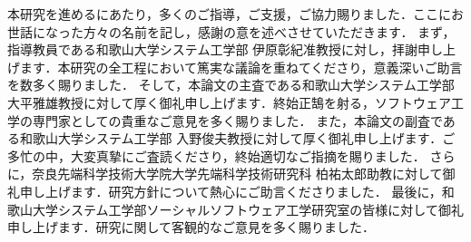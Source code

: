\documentclass[11pt]{jreport}
\begin{document}


\begin{acknowledgements}
本研究を進めるにあたり，多くのご指導，ご支援，ご協力賜りました．ここにお世話になった方々の名前を記し，感謝の意を述べさせていただきます．
まず，指導教員である和歌山大学システム工学部 伊原彰紀准教授に対し，拝謝申し上げます．本研究の全工程において篤実な議論を重ねてくださり，意義深いご助言を数多く賜りました．
そして，本論文の主査である和歌山大学システム工学部 大平雅雄教授に対して厚く御礼申し上げます．終始正鵠を射る，ソフトウェア工学の専門家としての貴重なご意見を多く賜りました．
また，本論文の副査である和歌山大学システム工学部 入野俊夫教授に対して厚く御礼申し上げます．ご多忙の中，大変真摯にご査読くださり，終始適切なご指摘を賜りました．
さらに，奈良先端科学技術大学院大学先端科学技術研究科 柏祐太郎助教に対して御礼申し上げます．研究方針について熱心にご助言くださりました．
最後に，和歌山大学システム工学部ソーシャルソフトウェア工学研究室の皆様に対して御礼申し上げます．研究に関して客観的なご意見を多く賜りました．
\end{acknowledgements}






\end{document}
